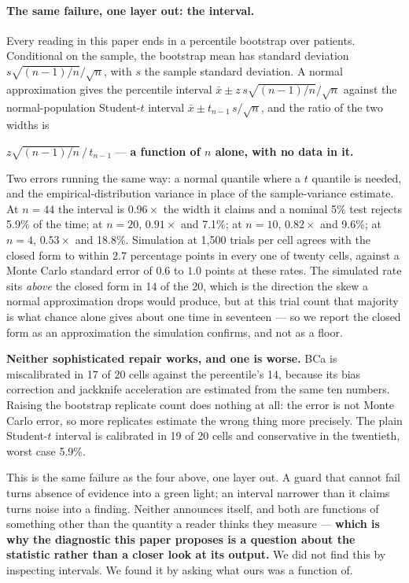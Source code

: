 \paragraph{The same failure, one layer out: the interval.}
Every reading in this paper ends in a percentile bootstrap over patients. Conditional on the sample, the
bootstrap mean has standard deviation $s\sqrt{(n-1)/n}/\sqrt{n}$, with $s$
the sample standard deviation. A normal approximation gives the percentile interval
$\bar{x} \pm z\,s\sqrt{(n-1)/n}/\sqrt{n}$ against the normal-population Student-$t$ interval
$\bar{x} \pm t_{n-1}\,s/\sqrt{n}$, and the ratio of the two widths is
\begin{center}
$z\sqrt{(n-1)/n} \,/\, t_{n-1}$ \quad --- \quad \textbf{a function of $n$ alone,
with no data in it.}
\end{center}
Two errors running the same way: a normal quantile where a $t$ quantile is
needed, and the empirical-distribution variance in place of the sample-variance
estimate. At
$n = 44$ the interval is $0.96\times$ the width it claims and a nominal 5\% test
rejects 5.9\% of the time; at $n = 20$, $0.91\times$ and 7.1\%; at $n = 10$,
$0.82\times$ and 9.6\%; at $n = 4$, $0.53\times$ and 18.8\%. Simulation at 1{,}500 trials per cell agrees
with the closed form to within $2.7$ percentage points in every one of twenty
cells, against a Monte Carlo standard error of $0.6$ to $1.0$ points at these
rates. The simulated rate sits \emph{above} the closed form in 14 of the 20,
which is the direction the skew a normal approximation drops would produce, but
at this trial count that majority is what chance alone gives about one time in
seventeen --- so we report the closed form as an approximation the simulation
confirms, and not as a floor.

\textbf{Neither sophisticated repair works, and one is worse.} BCa is
miscalibrated in 17 of 20 cells against the percentile's 14, because its bias
correction and jackknife acceleration are estimated from the same ten numbers.
Raising the bootstrap replicate count does nothing at all: the error is not
Monte Carlo error, so more replicates estimate the wrong thing more precisely.
The plain Student-$t$ interval is calibrated in 19 of 20 cells and conservative
in the twentieth, worst case 5.9\%.

This is the same failure as the four above, one layer out. A guard that cannot
fail turns absence of evidence into a green light; an interval narrower than it
claims turns noise into a finding. Neither announces itself, and both are
functions of something other than the quantity a reader thinks they measure ---
\textbf{which is why the diagnostic this paper proposes is a question about the
statistic rather than a closer look at its output.} We did not find this by
inspecting intervals. We found it by asking what ours was a function of.
